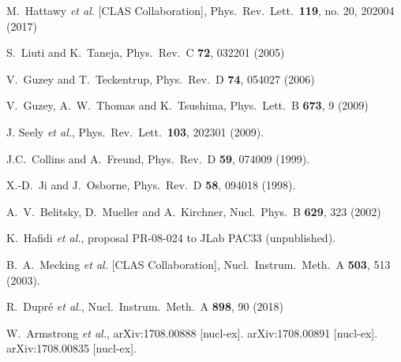 \documentclass[twocolumn,nofootinbib,showpacs,prl,superscriptaddress,secnumarabic,amssymb,nobibnotes,aps,floatfix]{revtex4}
\begin{document}
\begin{thebibliography}{99}
   M.~Hattawy {\it et al.} [CLAS Collaboration],
   Phys.\ Rev.\ Lett.\  {\bf 119}, no. 20, 202004 (2017)


S.~Liuti and K.~Taneja, Phys.\ Rev.\ C {\bf 72}, 032201 (2005)

 V.~Guzey and T.~Teckentrup, Phys.\ Rev.\ D {\bf 74}, 
   054027 (2006)

 V.~Guzey, A.~W.~Thomas and K.~Tsushima,
  Phys.\ Lett.\ B {\bf 673}, 9 (2009)

J. Seely {\it et al.}, Phys.\ Rev.\ Lett.\ {\bf 103}, 202301 (2009).


J.C.~Collins and A.~Freund, Phys.\ Rev.\ D {\bf 59}, 074009 (1999).

   X.-D.~Ji and J.~Osborne, Phys.\ Rev.\ D {\bf 58}, 094018 (1998).

A.~V.~Belitsky, D.~Mueller and A.~Kirchner,
Nucl.\ Phys.\ B {\bf 629}, 323 (2002)


 K.~Hafidi {\it et al.},
   proposal PR-08-024 to JLab PAC33 (unpublished).

 B.~A.~Mecking {\it et al.} [CLAS Collaboration],
   Nucl.\ Instrum.\ Meth.\ A {\bf 503}, 513 (2003).

  R.~Dupr\'e {\it et al.},
  Nucl.\ Instrum.\ Meth.\ A {\bf 898}, 90 (2018)

 W.~Armstrong {\it et al.},
     arXiv:1708.00888 [nucl-ex].
       arXiv:1708.00891 [nucl-ex].
         arXiv:1708.00835 [nucl-ex].





\end{thebibliography}
\end{document}
